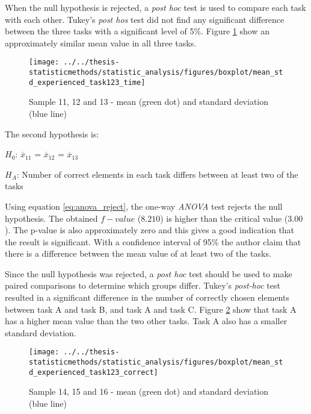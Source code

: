 When the null hypothesis is rejected, a \textit{post hoc} test is used to compare each task with each other. Tukey's \textit{post hos} test did not find any significant difference between the three tasks with a significant level of 5\%. Figure \ref{fig:meanstdexperiencedtask123time} show an approximately similar mean value in all three tasks. %

\begin{figure}[H]
	\centering
	\texttt{[image: ../../thesis-statisticmethods/statistic\_analysis/figures/boxplot/mean\_std\_experienced\_task123\_time]}
	\caption{Sample 11, 12 and 13 - mean (green dot) and standard deviation (blue line)}
	\label{fig:meanstdexperiencedtask123time}
\end{figure}


The second hypothesis is:\\
\centerline{$H_{0}$: $\overline{x}_11$ = $\overline{x}_12$ = $\overline{x}_13$}
\centerline{$H_{A}$: Number of correct elements in each task differs between at least two of the tasks}
\vspace{0.2cm}

Using equation \ref{eq:anova_reject}, the one-way \textit{ANOVA} test rejects the null hypothesis. The obtained $f-value$ ($8.210$) is higher than the critical value ($3.00$). The p-value is also approximately zero and this gives a good indication that the result is significant. With a confidence interval of 95\% the author claim that there is a difference between the mean value of at least two of the tasks. 

Since the null hypothesis was rejected, a \textit{post hoc} test should be used to make paired comparisons to determine which groups differ. Tukey's \textit{post-hoc} test resulted in a significant difference in the number of correctly chosen elements between task A and task B, and task A and task C. Figure \ref{fig:meanstdexperiencedtask123correct} show that task A has a higher mean value than the two other tasks. Task A also has a smaller standard deviation. 

\begin{figure}[H]
	\centering
	\texttt{[image: ../../thesis-statisticmethods/statistic\_analysis/figures/boxplot/mean\_std\_experienced\_task123\_correct]}
	\caption{Sample 14, 15 and 16 - mean (green dot) and standard deviation (blue line)}
	\label{fig:meanstdexperiencedtask123correct}
\end{figure}

